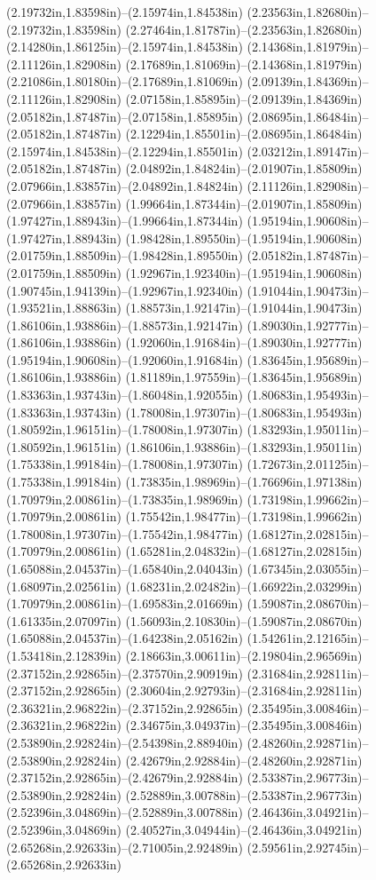 (2.19732in,1.83598in)--(2.15974in,1.84538in) (2.23563in,1.82680in)--(2.19732in,1.83598in) (2.27464in,1.81787in)--(2.23563in,1.82680in) (2.14280in,1.86125in)--(2.15974in,1.84538in) (2.14368in,1.81979in)--(2.11126in,1.82908in) (2.17689in,1.81069in)--(2.14368in,1.81979in) (2.21086in,1.80180in)--(2.17689in,1.81069in) (2.09139in,1.84369in)--(2.11126in,1.82908in) (2.07158in,1.85895in)--(2.09139in,1.84369in) (2.05182in,1.87487in)--(2.07158in,1.85895in) (2.08695in,1.86484in)--(2.05182in,1.87487in) (2.12294in,1.85501in)--(2.08695in,1.86484in) (2.15974in,1.84538in)--(2.12294in,1.85501in) (2.03212in,1.89147in)--(2.05182in,1.87487in) (2.04892in,1.84824in)--(2.01907in,1.85809in) (2.07966in,1.83857in)--(2.04892in,1.84824in) (2.11126in,1.82908in)--(2.07966in,1.83857in) (1.99664in,1.87344in)--(2.01907in,1.85809in) (1.97427in,1.88943in)--(1.99664in,1.87344in) (1.95194in,1.90608in)--(1.97427in,1.88943in) (1.98428in,1.89550in)--(1.95194in,1.90608in) (2.01759in,1.88509in)--(1.98428in,1.89550in) (2.05182in,1.87487in)--(2.01759in,1.88509in) (1.92967in,1.92340in)--(1.95194in,1.90608in) (1.90745in,1.94139in)--(1.92967in,1.92340in) (1.91044in,1.90473in)--(1.93521in,1.88863in) (1.88573in,1.92147in)--(1.91044in,1.90473in) (1.86106in,1.93886in)--(1.88573in,1.92147in) (1.89030in,1.92777in)--(1.86106in,1.93886in) (1.92060in,1.91684in)--(1.89030in,1.92777in) (1.95194in,1.90608in)--(1.92060in,1.91684in) (1.83645in,1.95689in)--(1.86106in,1.93886in) (1.81189in,1.97559in)--(1.83645in,1.95689in) (1.83363in,1.93743in)--(1.86048in,1.92055in) (1.80683in,1.95493in)--(1.83363in,1.93743in) (1.78008in,1.97307in)--(1.80683in,1.95493in) (1.80592in,1.96151in)--(1.78008in,1.97307in) (1.83293in,1.95011in)--(1.80592in,1.96151in) (1.86106in,1.93886in)--(1.83293in,1.95011in) (1.75338in,1.99184in)--(1.78008in,1.97307in) (1.72673in,2.01125in)--(1.75338in,1.99184in) (1.73835in,1.98969in)--(1.76696in,1.97138in) (1.70979in,2.00861in)--(1.73835in,1.98969in) (1.73198in,1.99662in)--(1.70979in,2.00861in) (1.75542in,1.98477in)--(1.73198in,1.99662in) (1.78008in,1.97307in)--(1.75542in,1.98477in) (1.68127in,2.02815in)--(1.70979in,2.00861in) (1.65281in,2.04832in)--(1.68127in,2.02815in) (1.65088in,2.04537in)--(1.65840in,2.04043in) (1.67345in,2.03055in)--(1.68097in,2.02561in) (1.68231in,2.02482in)--(1.66922in,2.03299in) (1.70979in,2.00861in)--(1.69583in,2.01669in) (1.59087in,2.08670in)--(1.61335in,2.07097in) (1.56093in,2.10830in)--(1.59087in,2.08670in) (1.65088in,2.04537in)--(1.64238in,2.05162in) (1.54261in,2.12165in)--(1.53418in,2.12839in) (2.18663in,3.00611in)--(2.19804in,2.96569in) (2.37152in,2.92865in)--(2.37570in,2.90919in) (2.31684in,2.92811in)--(2.37152in,2.92865in) (2.30604in,2.92793in)--(2.31684in,2.92811in) (2.36321in,2.96822in)--(2.37152in,2.92865in) (2.35495in,3.00846in)--(2.36321in,2.96822in) (2.34675in,3.04937in)--(2.35495in,3.00846in) (2.53890in,2.92824in)--(2.54398in,2.88940in) (2.48260in,2.92871in)--(2.53890in,2.92824in) (2.42679in,2.92884in)--(2.48260in,2.92871in) (2.37152in,2.92865in)--(2.42679in,2.92884in) (2.53387in,2.96773in)--(2.53890in,2.92824in) (2.52889in,3.00788in)--(2.53387in,2.96773in) (2.52396in,3.04869in)--(2.52889in,3.00788in) (2.46436in,3.04921in)--(2.52396in,3.04869in) (2.40527in,3.04944in)--(2.46436in,3.04921in) (2.65268in,2.92633in)--(2.71005in,2.92489in) (2.59561in,2.92745in)--(2.65268in,2.92633in) 